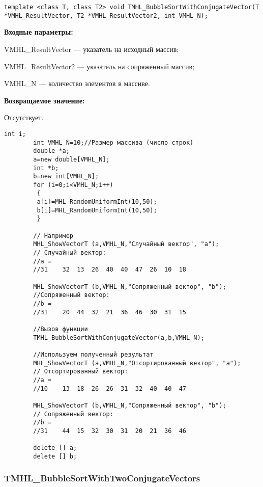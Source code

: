 \documentclass[a4paper,12pt]{article}
\begin{document}
\begin{lstlisting}[label=code_syntax_TMHL_BubbleSortWithConjugateVector,caption=Синтаксис]
template <class T, class T2> void TMHL_BubbleSortWithConjugateVector(T *VMHL_ResultVector, T2 *VMHL_ResultVector2, int VMHL_N);
\end{lstlisting}

\textbf{Входные параметры:}
 
VMHL\_ResultVector --- указатель на исходный массив;
 
VMHL\_ResultVector2 --- указатель на сопряженный массив;
 
VMHL\_N --- количество элементов в массиве.

\textbf{Возвращаемое значение:}

Отсутствует.


\begin{lstlisting}[label=code_use_TMHL_BubbleSortWithConjugateVector,caption=Пример использования]
        int i;
        int VMHL_N=10;//Размер массива (число строк)
        double *a;
        a=new double[VMHL_N];
        int *b;
        b=new int[VMHL_N];
        for (i=0;i<VMHL_N;i++)
         {
         a[i]=MHL_RandomUniformInt(10,50);
         b[i]=MHL_RandomUniformInt(10,50);
         }

        // Например
        MHL_ShowVectorT (a,VMHL_N,"Случайный вектор", "a");
        // Случайный вектор:
        //a =
        //31	32	13	26	40	40	47	26	10	18

        MHL_ShowVectorT (b,VMHL_N,"Сопряженный вектор", "b");
        //Сопряженный вектор:
        //b =
        //31	20	44	32	21	36	46	30	31	15

        //Вызов функции
        TMHL_BubbleSortWithConjugateVector(a,b,VMHL_N);

        //Используем полученный результат
        MHL_ShowVectorT (a,VMHL_N,"Отсортированный вектор", "a");
        // Отсортированный вектор:
        //a =
        //10	13	18	26	26	31	32	40	40	47

        MHL_ShowVectorT (b,VMHL_N,"Сопряженный вектор", "b");
        // Сопряженный вектор:
        //b =
        //31	44	15	32	30	31	20	21	36	46

        delete [] a;
        delete [] b;
\end{lstlisting}

\subsubsection{TMHL\_BubbleSortWithTwoConjugateVectors}\label{TMHL_BubbleSortWithTwoConjugateVectors}
\end{document}
